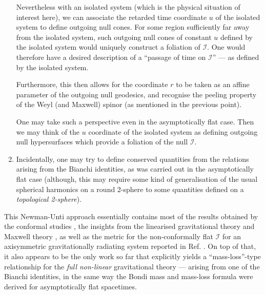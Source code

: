 \documentclass[aps,pre,preprint,superscriptaddress,showpacs,showkeys]{revtex4-1}
\begin{document}
\begin{enumerate}
Nevertheless with an isolated system (which is the physical situation of interest here), we can associate the retarded time coordinate $u$ of the isolated system to define outgoing null cones. For some region sufficiently far away from the isolated system, such outgoing null cones of constant $u$ defined by the isolated system would uniquely construct a foliation of $\mathcal{I}$. One would therefore have a desired description of a ``passage of time on $\mathcal{I}$'' --- as defined by the isolated system.


Furthermore, this then allows for the coordinate $r$ to be taken as an affine parameter of the outgoing null geodesics, and recognise the peeling property of the Weyl (and Maxwell) spinor (as mentioned in the previous point).

One may take such a perspective even in the asymptotically flat case. Then we may think of the $u$ coordinate of the isolated system as defining outgoing null hypersurfaces which provide a foliation of the null $\mathcal{I}$.
\item Incidentally, one may try to define conserved quantities from the relations arising from the Bianchi identities, as was carried out in the asymptotically flat case \cite{newpen65a,newpen68,exton} (although, this may require some kind of generalisation of the usual spherical harmonics on a round 2-sphere to some quantities defined on a \emph{topological 2-sphere}).
\end{enumerate}

This Newman-Unti approach essentially contains most of the results obtained by the conformal studies \cite{Szabados,ash1}, the insights from the linearised gravitational theory and Maxwell theory \cite{ash2,ash3,gracos1,gracos2}, as well as the metric for the non-conformally flat $\mathcal{I}$ for an axisymmetric gravitationally radiating system reported in Ref. \cite{chi1}. On top of that, it also appears to be the only work so far that explicitly yields a ``mass-loss''-type relationship for the \emph{full non-linear} gravitational theory --- arising from one of the Bianchi identities, in the same way the Bondi mass and mass-loss formula were derived for asymptotically flat spacetimes.
\end{document}
